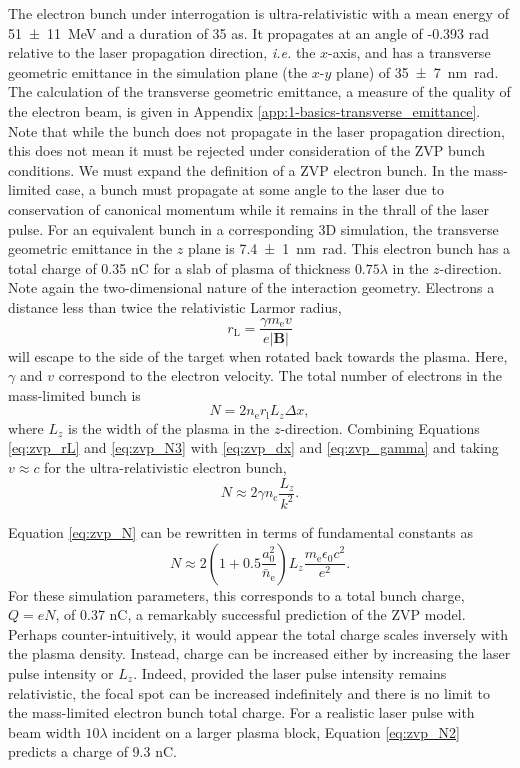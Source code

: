 The electron bunch under interrogation is ultra-relativistic with a mean energy of \qty{51\pm 11}{MeV} and a duration of 35 as. It propagates at an angle of -0.393 rad relative to the laser propagation direction, \textit{i.e.} the $x$-axis, and has a transverse geometric emittance in the simulation plane (the $x$-$y$ plane) of \qty{35 \pm 7}{nm.rad}. The calculation of the transverse geometric emittance, a measure of the quality of the electron beam, is given in Appendix \ref{app:1-basics-transverse_emittance}. Note that while the bunch does not propagate in the laser propagation direction, this does not mean it must be rejected under consideration of the ZVP bunch conditions. We must expand the definition of a ZVP electron bunch. In the mass-limited case, a bunch must propagate at some angle to the laser due to conservation of canonical momentum while it remains in the thrall of the laser pulse. For an equivalent bunch in a corresponding 3D simulation, the transverse geometric emittance in the $z$ plane is \qty{7.4\pm 1}{nm.rad}. This electron bunch has a total charge of 0.35 nC for a slab of plasma of thickness $0.75\lambda$ in the $z$-direction. Note again the two-dimensional nature of the interaction geometry. Electrons a distance less than twice the relativistic Larmor radius, 
\begin{equation}\label{eq:zvp_rL}
	r_\mathrm{L} = \frac{\gamma m_\mathrm{e}v}{e|\mathbf{B}|}
\end{equation}
will escape to the side of the target when rotated back towards the plasma. Here, $\gamma$ and $v$ correspond to the electron velocity. The total number of electrons in the mass-limited bunch is
\begin{equation}\label{eq:zvp_N3}
	N = 2 n_\mathrm{e} r_\mathrm{l} L_z \Delta x,
\end{equation}
where $L_z$ is the width of the plasma in the $z$-direction. Combining Equations \ref{eq:zvp_rL} and \ref{eq:zvp_N3} with \ref{eq:zvp_dx} and \ref{eq:zvp_gamma} and taking $v \approx c$ for the ultra-relativistic electron bunch, 
\begin{equation}\label{eq:zvp_N}
	N \approx 2 \gamma n_\mathrm{c} \frac{L_z}{k^2}.
\end{equation}

Equation \ref{eq:zvp_N} can be rewritten in terms of fundamental constants as
\begin{equation}\label{eq:zvp_N2}
	N \approx 2 (1+0.5\frac{a^2_0}{\bar{n}_\mathrm{e}}) L_z \frac{m_\mathrm{e}\epsilon_0c^2}{e^2}.
\end{equation}
For these simulation parameters, this corresponds to a total bunch charge, $Q = eN$, of 0.37 nC, a remarkably successful prediction of the ZVP model. Perhaps counter-intuitively, it would appear the total charge scales inversely with the plasma density. Instead, charge can be increased either by increasing the laser pulse intensity or $L_z$. Indeed, provided the laser pulse intensity remains relativistic, the focal spot can be increased indefinitely and there is no limit to the mass-limited electron bunch total charge. For a realistic laser pulse with beam width $10 \lambda$ incident on a larger plasma block, Equation \ref{eq:zvp_N2} predicts a charge of 9.3 nC.

